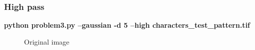         \pagebreak
        \subsubsection{High pass}

        \small{\textbf{python problem3.py --gaussian -d 5 --high characters\_test\_pattern.tif}}

        \begin{figure}[!htb]\centering
            \begin{minipage}{0.40\textwidth}
                \caption{\small{Original image}}
            \end{minipage}
            \begin{minipage}{0.40\textwidth}

\end{minipage}
\end{figure}
